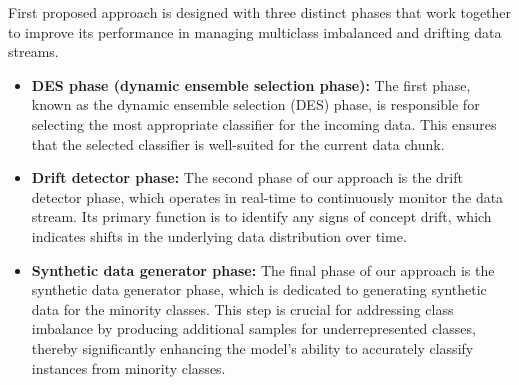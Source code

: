 First proposed approach is designed with three distinct phases that work together to improve its performance in managing multiclass imbalanced and drifting data streams. 
\begin{itemize}
	\item \textbf{DES phase (dynamic ensemble selection phase):} The first phase, known as the dynamic ensemble selection (DES) phase, is responsible for selecting the most appropriate classifier for the incoming data. This ensures that the selected classifier is well-suited for the current data chunk.
	\item \textbf{Drift detector phase:} The second phase of our approach is the drift detector phase, which operates in real-time to continuously monitor the data stream. Its primary function is to identify any signs of concept drift, which indicates shifts in the underlying data distribution over time.
	\item \textbf{Synthetic data generator phase:} The final phase of our approach is the synthetic data generator phase, which is dedicated to generating synthetic data for the minority classes. This step is crucial for addressing class imbalance by producing additional samples for underrepresented classes, thereby significantly enhancing the model's ability to accurately classify instances from minority classes.
\end{itemize}

